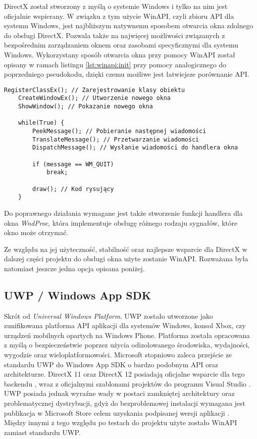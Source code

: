 DirectX został stworzony z myślą o systemie Windows i tylko na nim jest
oficjalnie wspierany. W związku z tym użycie WinAPI, czyli zbioru API
dla systemu Windows, jest najbliższym natywnemu sposobem otwarcia okna
zdolnego do obsługi DirectX. Pozwala także na najwięcej możliwości
związanych z bezpośrednim zarządzaniem oknem oraz zasobami specyficznymi
dla systemu Windows. Wykorzystany sposób otwarcia okna przy pomocy WinAPI został opisany
w ramach listingu \ref{lst:winapi:init} przy pomocy analogicznego do poprzedniego pseudokodu, dzięki czemu możliwe jest łatwiejsze porównanie API.

\begin{lstlisting}[caption={Pseudokod inicjalizacji okna WinAPI (oryginalna treść)}, label={lst:winapi:init}]
	RegisterClassEx(); // Zarejestrowanie klasy obiektu
	CreateWindowEx(); // Utworzenie nowego okna
	ShowWindow(); // Pokazanie nowego okna
	
	while(True) {
		PeekMessage(); // Pobieranie następnej wiadomości
		TranslateMessage(); // Przetwarzanie wiadomości
		DispatchMessage(); // Wysłanie wiadomości do handlera okna
	
		if (message == WM_QUIT)
			break;
		
		draw(); // Kod rysujący
	}
\end{lstlisting}

Do poprawnego działania wymagane jest także stworzenie funkcji handlera
dla okna \emph{WndProc}, która implementuje obsługę różnego rodzaju
sygnałów, które okno może otrzymać. 

Ze względu na jej użyteczność, stabilność oraz najlepsze wsparcie dla
DirectX w dalszej części projektu do obsługi okna użyte zostanie WinAPI. Rozważana była natomiast jeszcze jedna opcja opisana poniżej.

\subsection{UWP / Windows App SDK}

Skrót od \emph{Universal Windows Platform}. UWP zostało utworzone jako
zunifikowana platforma API aplikacji dla systemów Windows, konsol Xbox,
czy urządzeń mobilnych opartych na Windows Phone. Platforma została
opracowana z myślą o bezpieczeństwie poprzez użycia odizolowanego
środowiska, wydajności, wygodzie oraz wieloplatformowości. Microsoft
stopniowo zaleca przejście ze standardu UWP do Windows App SDK o bardzo
podobnym API oraz architekturze. DirectX 11 oraz DirectX 12 posiadają oficjalne wsparcie dla tego
backendu \cite{ms:dxuwp:2024}, wraz z oficjalnymi szablonami projektów do programu
Visual Studio \cite{ms:dxuwpui:2024}. UWP posiada jednak wyraźne wady w postaci zamkniętej architektury oraz
problematycznej dystrybucji, gdyż do bezproblemowej instalacji wymagana
jest publikacja w Microsoft Store celem uzyskania podpisanej wersji
aplikacji \cite{ms:uwppackaging:2024}. Między innymi z tego względu po testach do projektu użyte zostało WinAPI
zamiast standardu UWP.

